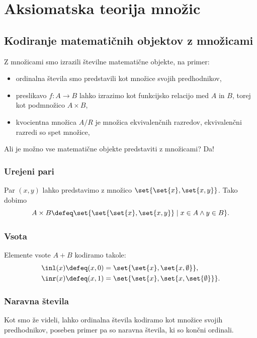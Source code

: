 \chapter{Aksiomatska teorija množic}
\label{cha:aksiomi-teorije-mnozic}

\section{Kodiranje matematičnih objektov z množicami}

Z množicami smo izrazili številne matematične objekte, na primer:
%
\begin{itemize}
\item ordinalna števila smo predstavili kot množice svojih predhodnikov,
\item preslikavo $f : A \to B$ lahko izrazimo kot funkcijsko relacijo med $A$ in $B$, torej kot
  podmnožico $A \times B$,
\item kvocientna množica $A/R$ je množica ekvivalenčnih razredov, ekvivalenčni razredi so spet
  množice,
\end{itemize}
%
Ali je možno vse matematične objekte predstaviti z množicami? Da!

\subsection{Urejeni pari}

Par $(x, y)$ lahko predstavimo z množico $\set{\set{x}, \set{x,y}}$. Tako dobimo
%
\begin{equation*}
  A \times B \defeq \set{ \set{\set{x}, \set{x,y}} \mid x \in A \land y \in B }.
\end{equation*}


\subsection{Vsota}

Elemente vsote $A + B$ kodiramo takole:
%
\begin{align*}
  \inl(x) &\defeq (x, 0) = \set{\set{x}, \set{x, \emptyset}}, \\
  \inr(x) &\defeq (x, 1) = \set{\set{x}, \set{x, \set{\emptyset}}}.
\end{align*}


\subsection{Naravna števila}

Kot smo že videli, lahko ordinalna števila kodiramo kot množice svojih predhodnikov, poseben primer pa so naravna števila, ki so končni ordinali.


